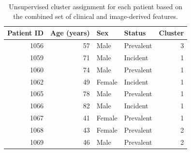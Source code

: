\begin{table}[htbp]
    \centering
    \caption{Unsupervised cluster assignment for each patient based on the combined set of clinical and image-derived features.}
    \label{tab:patient_clusters_all_features}
\begin{tabular}{rrllr}
\toprule
Patient ID & Age (years) & Sex & Status & Cluster \\
\midrule
1056 & 57 & Male & Prevalent & 3 \\
1059 & 71 & Male & Incident & 1 \\
1060 & 74 & Male & Prevalent & 1 \\
1062 & 49 & Female & Incident & 1 \\
1065 & 78 & Male & Prevalent & 1 \\
1066 & 82 & Male & Incident & 1 \\
1067 & 41 & Female & Prevalent & 1 \\
1068 & 43 & Female & Prevalent & 2 \\
1069 & 46 & Male & Prevalent & 2 \\
\bottomrule
\end{tabular}

\end{table}
